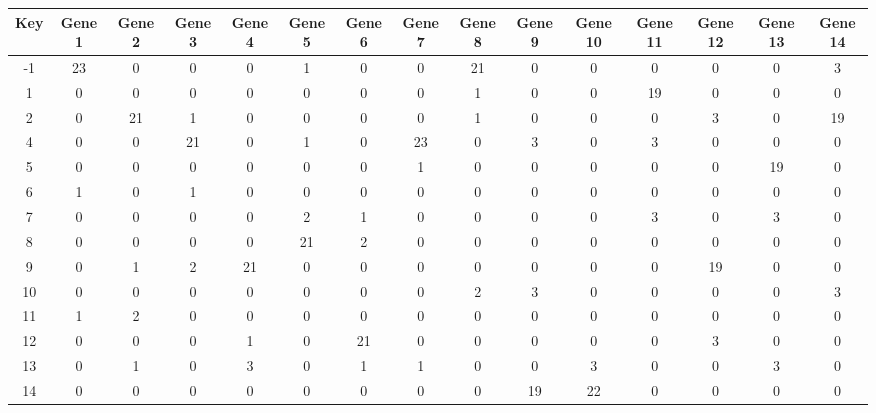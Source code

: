 \begin{tabular}{|c|c|c|c|c|c|c|c|c|c|c|c|c|c|c|}
\hline
Key & Gene 1 & Gene 2 & Gene 3 & Gene 4 & Gene 5 & Gene 6 & Gene 7 & Gene 8 & Gene 9 & Gene 10 & Gene 11 & Gene 12 & Gene 13 & Gene 14 \\
\hline
-1 & 23 & 0 & 0 & 0 & 1 & 0 & 0 & 21 & 0 & 0 & 0 & 0 & 0 & 3 \\
1 & 0 & 0 & 0 & 0 & 0 & 0 & 0 & 1 & 0 & 0 & 19 & 0 & 0 & 0 \\
2 & 0 & 21 & 1 & 0 & 0 & 0 & 0 & 1 & 0 & 0 & 0 & 3 & 0 & 19 \\
4 & 0 & 0 & 21 & 0 & 1 & 0 & 23 & 0 & 3 & 0 & 3 & 0 & 0 & 0 \\
5 & 0 & 0 & 0 & 0 & 0 & 0 & 1 & 0 & 0 & 0 & 0 & 0 & 19 & 0 \\
6 & 1 & 0 & 1 & 0 & 0 & 0 & 0 & 0 & 0 & 0 & 0 & 0 & 0 & 0 \\
7 & 0 & 0 & 0 & 0 & 2 & 1 & 0 & 0 & 0 & 0 & 3 & 0 & 3 & 0 \\
8 & 0 & 0 & 0 & 0 & 21 & 2 & 0 & 0 & 0 & 0 & 0 & 0 & 0 & 0 \\
9 & 0 & 1 & 2 & 21 & 0 & 0 & 0 & 0 & 0 & 0 & 0 & 19 & 0 & 0 \\
10 & 0 & 0 & 0 & 0 & 0 & 0 & 0 & 2 & 3 & 0 & 0 & 0 & 0 & 3 \\
11 & 1 & 2 & 0 & 0 & 0 & 0 & 0 & 0 & 0 & 0 & 0 & 0 & 0 & 0 \\
12 & 0 & 0 & 0 & 1 & 0 & 21 & 0 & 0 & 0 & 0 & 0 & 3 & 0 & 0 \\
13 & 0 & 1 & 0 & 3 & 0 & 1 & 1 & 0 & 0 & 3 & 0 & 0 & 3 & 0 \\
14 & 0 & 0 & 0 & 0 & 0 & 0 & 0 & 0 & 19 & 22 & 0 & 0 & 0 & 0 \\
\hline
\end{tabular}
